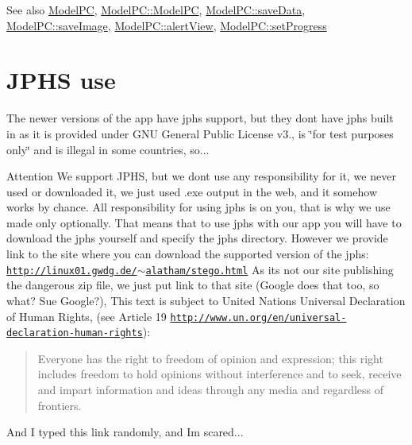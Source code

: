  \begin{DoxySeeAlso}{See also}
\mbox{\hyperlink{class_model_p_c}{Model\+PC}}, \mbox{\hyperlink{class_model_p_c_ae12ebe65ec973c02a0de4850a7c1e31c}{Model\+P\+C\+::\+Model\+PC}}, \mbox{\hyperlink{class_model_p_c_a67c4fd6db2cd4a3bb23a2fc48f7cceff}{Model\+P\+C\+::save\+Data}}, \mbox{\hyperlink{class_model_p_c_a5af79bd5fd50d7be0646778bc99413b9}{Model\+P\+C\+::save\+Image}}, \mbox{\hyperlink{class_model_p_c_aef1f058227af54e4cfc9fc4c4397d30c}{Model\+P\+C\+::alert\+View}}, \mbox{\hyperlink{class_model_p_c_a25a4496e129e87ac96f12257a123b84f}{Model\+P\+C\+::set\+Progress}}
\end{DoxySeeAlso}
\hypertarget{index_jphs-use}{}\section{J\+P\+H\+S use}\label{index_jphs-use}
The newer versions of the app have jphs support, but they don\textquotesingle{}t have jphs built in as it is provided under G\+NU General Public License v3., is \char`\"{}for test purposes only\char`\"{} and is illegal in some countries, so... \begin{DoxyAttention}{Attention}
We support J\+P\+HS, but we don\textquotesingle{}t use any responsibility for it, we never used or downloaded it, we just used .exe output in the web, and it somehow works by chance. All responsibility for using jphs is on you, that is why we use made only optionally. That means that to use jphs with our app you will have to download the jphs yourself and specify the jphs directory. However we provide link to the site where you can download the supported version of the jphs\+: \href{http://linux01.gwdg.de/~alatham/stego.html}{\tt http\+://linux01.\+gwdg.\+de/$\sim$alatham/stego.\+html} As it\textquotesingle{}s not our site publishing the dangerous zip file, we just put link to that site (Google does that too, so what? Sue Google?), This text is subject to United Nations\textquotesingle{} Universal Declaration of Human Rights, (see Article 19 \href{http://www.un.org/en/universal-declaration-human-rights}{\tt http\+://www.\+un.\+org/en/universal-\/declaration-\/human-\/rights})\+: \begin{quote}
Everyone has the right to freedom of opinion and expression; this right includes freedom to hold opinions without interference and to seek, receive and impart information and ideas through any media and regardless of frontiers. \end{quote}
And I typed this link randomly, and I\textquotesingle{}m scared...
\end{DoxyAttention}

